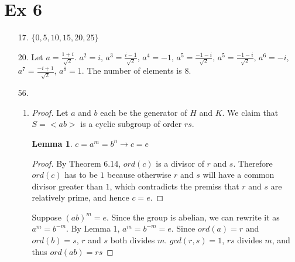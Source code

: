 \documentclass{article}
\newtheorem{lemma}{Lemma}
\begin{document}
\section*{Ex 6}
\begin{itemize}
\item [17.] $\{0,5,10,15,20,25\}$
\item [20.] Let $a = \frac{1+i}{\sqrt{2}}$.
  $a^2=i$, $a^3=\frac{i-1}{\sqrt{2}}$, $a^4=-1$,
  $a^5=\frac{-1-i}{\sqrt{2}}$, $a^5=\frac{-1-i}{\sqrt{2}}$, $a^6=-i$,
  $a^7=\frac{-i+1}{\sqrt{2}}$, $a^8=1$. The number of elements is $8$.
\item [56.]
  \begin{enumerate}[label=\alph*.]
  \item
    \begin{proof}
      Let $a$ and $b$ each be the generator of $H$ and $K$.  We claim
      that $S=<ab>$ is a cyclic subgroup of order $rs$.

    \begin{lemma}
      $c= a^m = b^n \rightarrow c = e$
    \end{lemma}
    \begin{proof}
      By Theorem 6.14,
      $ord(c)$ is a divisor of $r$ and $s$. Therefore $ord(c)$ has to
      be $1$ because otherwise $r$ and $s$ will have a common divisor
      greater than $1$, which contradicts the premiss that $r$ and $s$
      are relatively prime, and hence $c=e$.
    \end{proof}
    Suppose $(ab)^m = e$. Since the group is abelian, we can rewrite
    it as $a^m = b^{-m}$. By Lemma 1, $a^m=b^{-m}=e$. Since $ord(a)=r$
    and $ord(b)=s$, $r$ and $s$ both divides $m$. $gcd(r,s)=1$,
    $rs$ divides $m$, and thus $ord(ab)=rs$
  \end{proof}
  \end{enumerate}
\end{itemize}
\end{document}
